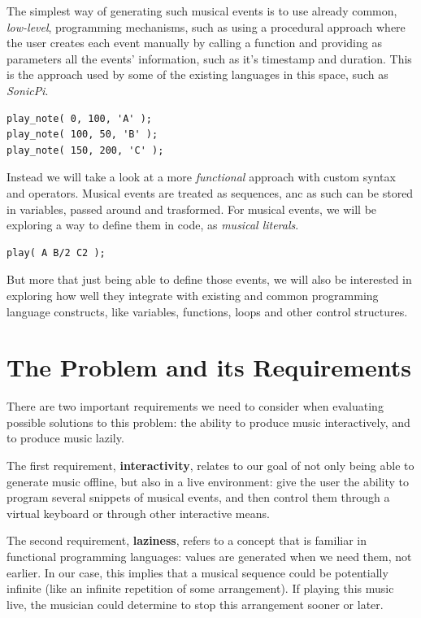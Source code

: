 \documentclass[a4paper,UKenglish,cleveref, autoref]{oasics-v2019}
\begin{document}
The simplest way of generating such musical events is to use already common, \textit{low-level}, programming mechanisms, such as using a procedural approach where the user creates each event manually by calling a function and providing as parameters all the events' information, such as it's timestamp and duration. This is the approach used by some of the existing languages in this space, such as \textit{SonicPi}.

\begin{lstlisting}[caption={Example of a hypothetical imperative API for creating events},label=list:8-6,captionpos=t,abovecaptionskip=-\medskipamount]
play_note( 0, 100, 'A' );
play_note( 100, 50, 'B' );
play_note( 150, 200, 'C' );
\end{lstlisting}

Instead we will take a look at a more \textit{functional} approach with custom syntax and operators. Musical events are treated as sequences, anc as such can be stored in variables, passed around and trasformed. For musical events, we will be exploring a way to define them in code, as \textit{musical literals}.

\begin{lstlisting}[caption={Our proposed declarative syntax that calculates timings implicitly},label=list:8-6,captionpos=t,abovecaptionskip=-\medskipamount]
play( A B/2 C2 );
\end{lstlisting}

But more that just being able to define those events, we will also be interested in exploring how well they integrate with existing and common programming language constructs, like variables, functions, loops and other control structures.

\section{The Problem and its Requirements}
There are two important requirements we need to consider when evaluating possible solutions to this problem: the ability to produce music interactively, and to produce music lazily.

The first requirement, \textbf{interactivity}, relates to our goal of not only being able to generate music offline, but also in a live environment: give the user the ability to program several snippets of musical events, and then control them through a virtual keyboard or through other interactive means.

The second requirement, \textbf{laziness}, refers to a concept that is familiar in functional programming languages: values are generated when we need them, not earlier. In our case, this implies that a musical sequence could be potentially infinite (like an infinite repetition of some arrangement). If playing this music live, the musician could determine to stop this arrangement sooner or later.
\end{document}
